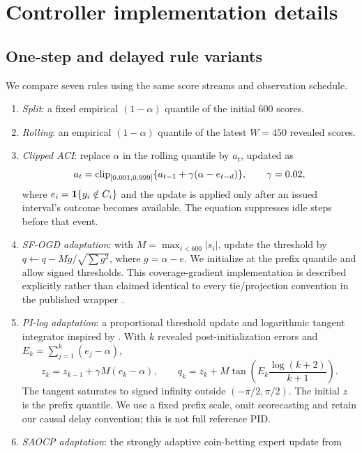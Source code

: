 \setlength{\bibsep}{4pt}


\section{Controller implementation details}\label{app:rules}
\subsection{One-step and delayed rule variants}
We compare seven rules using the same score streams and observation schedule.
\begin{enumerate}
\item \emph{Split}: a fixed empirical $(1-\alpha)$ quantile of the initial 600 scores.
\item \emph{Rolling}: an empirical $(1-\alpha)$ quantile of the latest $W=450$ revealed scores.
\item \emph{Clipped ACI}: replace $\alpha$ in the rolling quantile by $a_t$, updated as
\begin{equation}\label{eq:aciappendix}
 a_t=\operatorname{clip}_{[0.001,0.999]}\{a_{t-1}+\gamma(\alpha-e_{t-d})\},\qquad \gamma=0.02,
\end{equation}
where $e_i=\mathbf{1}\{y_i\notin C_i\}$ and the update is applied only after an issued interval's
outcome becomes available. The equation suppresses idle steps before that event.
\item \emph{SF-OGD adaptation}: with $M=\max_{i<600}|s_i|$, update the threshold by
$q\leftarrow q-Mg/\sqrt{\sum g^2}$, where $g=\alpha-e$. We initialize at the prefix
quantile and allow signed thresholds. This coverage-gradient implementation is described
explicitly rather than claimed identical to every tie/projection convention in the
published wrapper \citep{bhatnagar2023saocp}.
\item \emph{PI-log adaptation}: a proportional threshold update and logarithmic tangent
integrator inspired by \citet{angelopoulos2023pid}. With $k$ revealed post-initialization
errors and $E_k=\sum_{j=1}^k(e_j-\alpha)$,
\begin{equation}\label{eq:pi}
 z_k=z_{k-1}+\gamma M(e_k-\alpha),\qquad
 q_k=z_k+M\tan\!\left(E_k\frac{\log(k+2)}{k+1}\right).
\end{equation}
The tangent saturates to signed infinity outside $(-\pi/2,\pi/2)$. The initial $z$ is the
prefix quantile. We use a fixed prefix scale, omit scorecasting and retain our causal
delay convention; this is not full reference PID.
\item \emph{SAOCP adaptation}: the strongly adaptive coin-betting expert update from

\end{enumerate}
